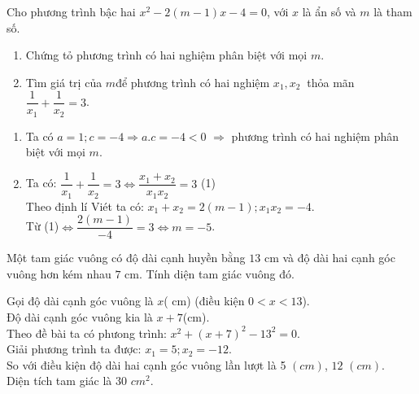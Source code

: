 \begin{ex}%
    Cho phương trình bậc hai $x^2-2(m-1)x-4=0$, với $x$ là ẩn số và $m$ là tham số.
    \begin{enumerate}
        \item Chứng tỏ phương trình có hai nghiệm phân biệt với mọi $m$.
        \item Tìm giá trị của $m$để phương trình có hai nghiệm $x_1,x_2~$ thỏa mãn $\dfrac{1}{x_1}+\dfrac{1}{x_2}=3$.
    \end{enumerate}
\loigiai
    {
    \begin{enumerate}
        \item  Ta có $a=1;c=-4\Rightarrow a.c=-4<0$
$\Rightarrow $ phương trình có hai nghiệm phân biệt với mọi $m$.
        \item  Ta có: $\dfrac{1}{x_1}+\dfrac{1}{x_2}=3\Leftrightarrow \dfrac{x_1+x_2}{x_1x_2}=3$ (1)\\
Theo định lí Viét ta có: $x_1+x_2=2\left(m-1\right);x_1x_2=-4$.\\
 Từ (1)$\Leftrightarrow \dfrac{2\left(m-1\right)}{-4}=3\Leftrightarrow m=-5$.
\end{enumerate}
    }
\end{ex}

\begin{ex}%
    Một tam giác vuông có độ dài cạnh huyền bằng $13$ cm và độ dài hai cạnh góc vuông hơn kém nhau $7$ cm. Tính diện tam giác vuông đó.
\loigiai
    {
Gọi độ dài cạnh góc vuông là $x$( cm) (điều kiện $0<x<13$).\\
Độ dài cạnh góc vuông kia là $x+7$(cm).\\
Theo đề bài ta có phưong trình: $x^2+(x+7)^2-13^2=0$.\\
Giải phương trình ta được: $x_1=5;x_2=-12$.\\
So với điều kiện độ dài hai cạnh góc vuông lần lượt là 5 $\left(cm\right)$, $12$ $\left(cm\right)$.\\
Diện tích tam giác là 30 $cm^2$.

    }
\end{ex}

